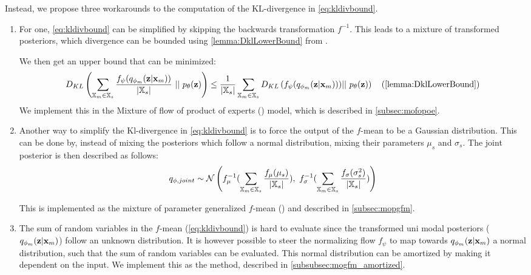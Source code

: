 Instead, we propose three workarounds to the computation of the KL-divergence in \cref{eq:kldivbound}.
\begin{enumerate}

    \item For one, \cref{eq:kldivbound} can be simplified by skipping the backwards transformation $f^{-1}$.
    This leads to a mixture of transformed posteriors, which divergence can be bounded using \cref{lemma:DklLowerBound} from \parencite{sutter_multimodal_2020}.

    We then get an upper bound that can be minimized:
    \begin{equation}
        D_{KL}\left(\sum _{\xsetm \in \xsubset} \frac{f_{\psi}(\unimodalpost)}{|\xsubset|}\ ||\ \prior\right) \leq \frac{1}{|\xsubset|} \sum  _{\xsetm \in \xsubset} D_{KL} \left(f_{\psi} (\unimodalpost))||\ \prior \right) \quad (\cref{lemma:DklLowerBound})
    \end{equation}
    We implement this in the Mixture of flow of product of experts () model, which is described in \cref{subsec:mofopoe}.


    \item Another way to simplify the Kl-divergence in \cref{eq:kldivbound} is to force the output of the $f$-mean to be a Gaussian distribution.
    This can be done by, instead of mixing the posteriors which follow a normal distribution, mixing their parameters $\mu_s$ and $\sigma_s$.
    The joint posterior is then described as follows:
    \begin{equation}
        \label{eq:qjointmopgfm}
        q_{\phi, joint} \sim \mathcal{N}\left(  f_{\mu}^{-1}(\sum _{\xsetm \in \xsubset} \frac{f_{\mu}(\mu_s)}{|\xsubset|}),\ f_{\sigma}^{-1}(\sum  _{\xsetm \in \xsubset} \frac{f_{\sigma}(\sigma_s^2)}{|\xsubset|})\right)
    \end{equation}

    This is implemented as the mixture of parameter generalized $f$-mean () and described in \cref{subsec:mopgfm}.

    \item The sum of random variables in the $f$-mean (\cref{eq:kldivbound}) is hard to evaluate since the transformed uni modal posteriors ($q_{\phi_m}(\textbf{z}|\textbf{x}_m)$) follow an unknown distribution.
    It is however possible to steer the normalizing flow $f_{\psi}$ to map towards $q_{\phi_m}(\textbf{z}|\textbf{x}_m)$ a normal distribution, such that the sum of random variables can be evaluated.
    This normal distribution can be amortized by making it dependent on the input.
    We implement this as the  method, described in \cref{subsubsec:mogfm_amortized}.


\end{enumerate}
